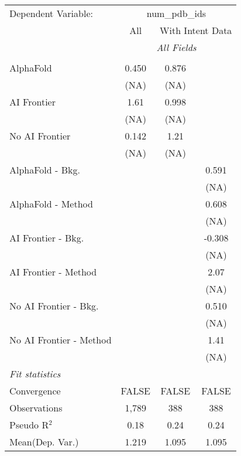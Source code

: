 \begingroup
\centering
\begin{tabular}{lccc}
   \tabularnewline \midrule \midrule
   Dependent Variable: & \multicolumn{3}{c}{num\_pdb\_ids}\\
 & \multicolumn{1}{c}{All} & \multicolumn{2}{c}{With Intent Data} \\
\cmidrule(lr){2-2} \cmidrule(lr){3-4}
 & \multicolumn{3}{c}{\textit{All Fields}} \\ \\
   AlphaFold               & 0.450 & 0.876 &   \\   
                           & (NA)  & (NA)  &   \\   
   AI Frontier             & 1.61  & 0.998 &   \\   
                           & (NA)  & (NA)  &   \\   
   No AI Frontier          & 0.142 & 1.21  &   \\   
                           & (NA)  & (NA)  &   \\   
   AlphaFold - Bkg.        &       &       & 0.591\\   
                           &       &       & (NA)\\   
   AlphaFold - Method      &       &       & 0.608\\   
                           &       &       & (NA)\\   
   AI Frontier - Bkg.      &       &       & -0.308\\   
                           &       &       & (NA)\\   
   AI Frontier - Method    &       &       & 2.07\\   
                           &       &       & (NA)\\   
   No AI Frontier - Bkg.   &       &       & 0.510\\   
                           &       &       & (NA)\\   
   No AI Frontier - Method &       &       & 1.41\\   
                           &       &       & (NA)\\   
   \midrule
   \emph{Fit statistics}\\
   Convergence             &FALSE  & FALSE & FALSE\\  
   Observations            & 1,789 & 388   & 388\\  
   Pseudo R$^2$            & 0.18  & 0.24  & 0.24\\  
Mean(Dep. Var.) & 1.219 & 1.095 & 1.095 \\
   

\end{tabular}
